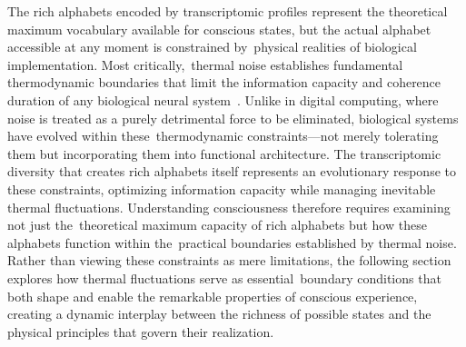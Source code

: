 The rich alphabets encoded by transcriptomic profiles represent the theoretical maximum vocabulary available for conscious states, but the actual alphabet accessible at any moment is constrained by~physical realities of biological implementation. Most critically,~thermal noise establishes fundamental thermodynamic boundaries that limit the information capacity and coherence duration of any biological neural system~\cite{faisal2008, mcdonnell2011}. Unlike in digital computing, where noise is treated as a purely detrimental force to be eliminated, biological systems have evolved within these~thermodynamic constraints—not merely tolerating them but incorporating them into functional architecture. The transcriptomic diversity that creates rich alphabets itself represents an evolutionary response to these constraints, optimizing information capacity while managing inevitable thermal fluctuations. Understanding consciousness therefore requires examining not just the~theoretical maximum capacity of rich alphabets but how these alphabets function within the~practical boundaries established by thermal noise. Rather than viewing these constraints as mere limitations, the following section explores how thermal fluctuations serve as essential~boundary conditions that both shape and enable the remarkable properties of conscious experience, creating a dynamic interplay between the richness of possible states and the physical principles that govern their realization.
